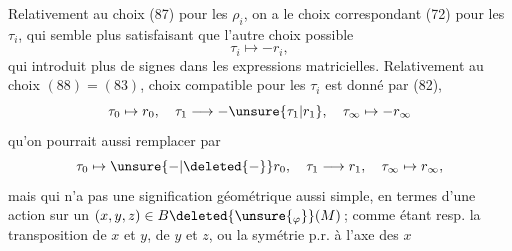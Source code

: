 Relativement au choix (87) pour les $\rho_i$, on a le choix correspondant (72) pour les $\tau_i$, qui semble plus satisfaisant que l'autre choix possible
\[
\tau_i\mapsto-r_i,
\]
qui introduit plus de signes dans les expressions matricielles. Relativement au choix $(88)=(83)$,  choix  compatible pour les $\tau_i$ est donné par (82), 
\[
\tau_0\mapsto r_0,\quad\tau_1\longrightarrow-\unsure{\tau_1|r_1},\quad\tau_\infty\mapsto-r_\infty
\]
qu'on pourrait aussi remplacer par
\[
\tau_0\mapsto\unsure{-|\deleted{-}}r_0,\quad\tau_1\longrightarrow r_1,\quad\tau_\infty\mapsto r_\infty,
\]
mais qui n'a pas une signification géométrique aussi simple, en termes d'une action sur un $(x,y,z)\in B\deleted{\unsure{_{\varphi}}}(M)$\,; comme étant resp. la transposition de $x$ et $y$, de $y$ et $z$, ou la symétrie p.r. à l'axe des $x$

